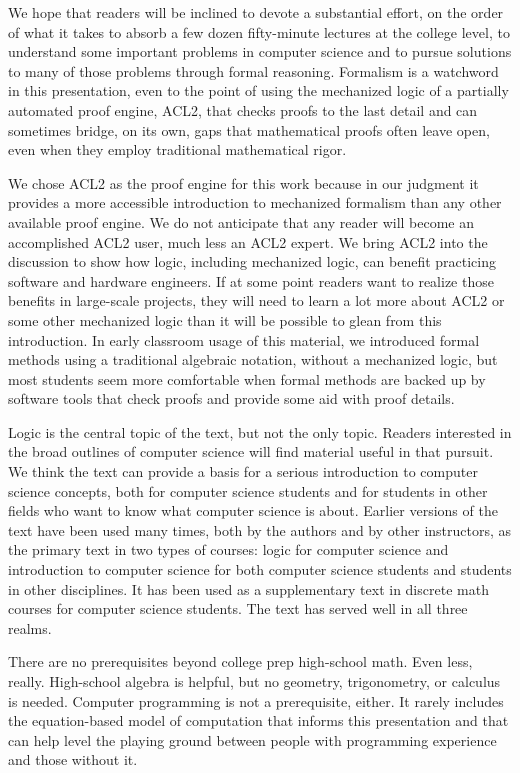 We hope that readers will be inclined
to devote a substantial effort, on the order
of what it takes to absorb a few dozen fifty-minute
lectures at the college level,
to understand some important problems in computer science and
to pursue solutions to many of those problems through formal reasoning.
Formalism is a watchword in this presentation, even to the
point of using the mechanized logic of a partially automated proof engine,
ACL2, that checks proofs to the last detail and can sometimes 
bridge, on its own, gaps that mathematical
proofs often leave open, even when they employ traditional
mathematical rigor.

We chose ACL2 as the proof engine for this work
because in our judgment it provides a more accessible
introduction to mechanized formalism than any other
available proof engine. We do not anticipate that any
reader will become an accomplished ACL2 user,
much less an ACL2 expert. We bring ACL2 into the discussion
to show how logic, including mechanized logic,
can benefit practicing software and hardware engineers.
If at some point readers want to realize those benefits in
large-scale projects, they will need to learn a lot more
about ACL2 or some other mechanized logic than it will
be possible to glean from this introduction.
In early classroom usage of this material,
we introduced formal methods using a traditional algebraic notation,
without a mechanized logic, but most students seem more comfortable
when formal methods are backed up by software tools
that check proofs and provide some aid with proof details.

Logic is the central topic of the text, but not the only topic.
Readers interested in the broad outlines of computer science
will find material useful in that pursuit.
We think the text can provide a basis for a serious introduction
to computer science concepts, both for computer science students
and for students in other fields who want to know
what computer science is about.
Earlier versions of the text have been used many times,
both by the authors and by other instructors,
as the primary text in two types of courses: logic for computer science
and introduction to computer science for both computer science students
and students in other disciplines. It has been used as a supplementary
text in discrete math courses for computer science students.
The text has served well in all three realms.

There are no prerequisites beyond college prep high-school math.
Even less, really.
High-school algebra is helpful,
but no geometry, trigonometry, or calculus is needed.
Computer programming is not a prerequisite, either.
It rarely includes the equation-based model of computation
that informs this presentation and that can
help level the playing ground between people
with programming experience and those without it.

